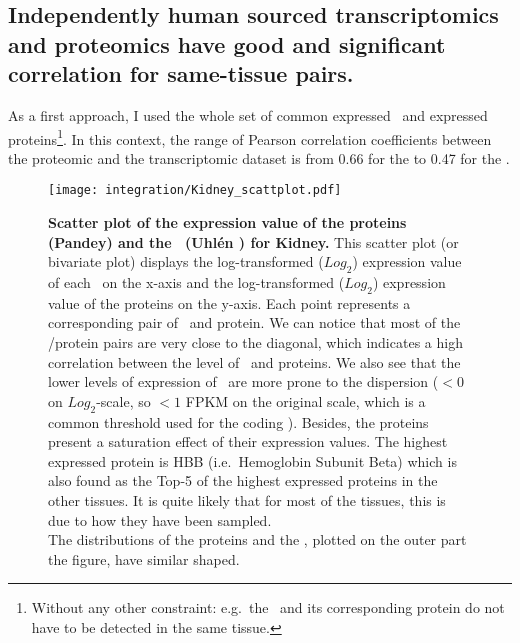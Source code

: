 \subsection{Independently human sourced transcriptomics and proteomics
have good and significant correlation for same-tissue pairs.}
\label{subsec:IntegrationGoodCorrProtTrans}

As a first approach, I used the whole set of common expressed \mRNAs\ and
expressed proteins\footnote{Without any other constraint: e.g.\ the \mRNA\ and
its corresponding protein do not have to be detected in the same tissue.}.
In this context, the range of Pearson correlation coefficients between the
proteomic and the transcriptomic dataset is from $0.66$ for the 
to 0.47 for the . 

\begin{figure}%
    \texttt{[image: integration/Kidney\_scattplot.pdf]}\centering
    \caption[Scatter plot of the expression value of the proteins (Pandey)
    and the \mRNAs\ (Uhlén \etal) for Kidney]
    {\label{fig:ScatKid}\textbf{Scatter plot of the expression value of the
    proteins (Pandey) and the \mRNAs\ (Uhlén \etal) for Kidney.}
    This scatter plot (or bivariate plot) displays the
    log-transformed ($Log_{2}$) expression value of
    each \mRNA\ on the x-axis and the log-transformed ($Log_{2}$)
    expression value of the proteins on the
    y-axis. Each point represents a corresponding pair of \mRNA\ and protein.
    We can notice that most of the \mRNA/protein pairs are very close to
    the diagonal, which indicates a high correlation between the level
    of \mRNAs\ and proteins. We also see that the lower levels of expression of
    \mRNAs\ are more prone to the dispersion ($<0$ on $Log_{2}$-scale, so $<1$
    \gls{FPKM} on the original scale, which is a common threshold used for the
    coding \mRNAs). Besides, the proteins present a saturation effect of their
    expression values. The highest expressed protein is HBB (i.e.\ Hemoglobin
    Subunit Beta) which is also found as the Top-5 of the highest expressed
    proteins in the other tissues. It is quite likely that for most of the tissues,
    this is due to how they have been sampled.
    \\The distributions of the proteins and the \mRNAs, plotted on the outer part
    the figure, have similar shaped.}
\end{figure}

